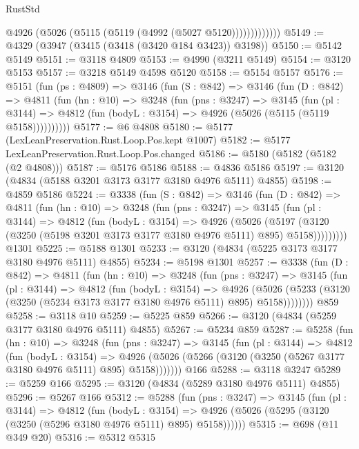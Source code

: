 \begin{lexlean}{RustStd}
\begin{coremodule}
{\begin{coremodule}
{{{{{{{{{{{{{{{{{{{{{{{{{{                  @4926 (@5026 (@5115 (@5119 (@4992 (@5027 @5120)))))))))))))
@5149 := @4329 (@3947 (@3415 (@3418 (@3420 @184 @3423)) @3198))
@5150 := @5142 @5149
@5151 := @3118 @4809
@5153 := @4990 (@3211 @5149)
@5154 := @3120 @5153
@5157 := @3218 @5149 @4598 @5120
@5158 := @5154 @5157
@5176 := @5151
    (fun (ps : @4809) =>
    @3146
      (fun (S : @842) =>
      @3146
        (fun (D : @842) =>
        @4811
          (fun (hn : @10) =>
          @3248
            (fun (pns : @3247) =>
            @3145
              (fun (pl : @3144) =>
              @4812 (fun (bodyL : @3154) => @4926 (@5026 (@5115 (@5119 @5158))))))))))
@5177 := @6 @4808
@5180 := @5177 (LexLeanPreservation.Rust.Loop.Pos.kept @1007)
@5182 := @5177 LexLeanPreservation.Rust.Loop.Pos.changed
@5186 := @5180 (@5182 (@5182 (@2 @4808)))
@5187 := @5176 @5186
@5188 := @4836 @5186
@5197 := @3120 (@4834 (@5188 @3201 @3173 @3177 @3180 @4976 @5111) @4855)
@5198 := @4859 @5186
@5224 := @3338
    (fun (S : @842) =>
    @3146
      (fun (D : @842) =>
      @4811
        (fun (hn : @10) =>
        @3248
          (fun (pns : @3247) =>
          @3145
            (fun (pl : @3144) =>
            @4812
              (fun (bodyL : @3154) =>
              @4926
                (@5026
                  (@5197
                    (@3120 (@3250 (@5198 @3201 @3173 @3177 @3180 @4976 @5111) @895) @5158)))))))))
    @1301
@5225 := @5188 @1301
@5233 := @3120 (@4834 (@5225 @3173 @3177 @3180 @4976 @5111) @4855)
@5234 := @5198 @1301
@5257 := @3338
    (fun (D : @842) =>
    @4811
      (fun (hn : @10) =>
      @3248
        (fun (pns : @3247) =>
        @3145
          (fun (pl : @3144) =>
          @4812
            (fun (bodyL : @3154) =>
            @4926
              (@5026 (@5233 (@3120 (@3250 (@5234 @3173 @3177 @3180 @4976 @5111) @895) @5158))))))))
    @859
@5258 := @3118 @10
@5259 := @5225 @859
@5266 := @3120 (@4834 (@5259 @3177 @3180 @4976 @5111) @4855)
@5267 := @5234 @859
@5287 := @5258
    (fun (hn : @10) =>
    @3248
      (fun (pns : @3247) =>
      @3145
        (fun (pl : @3144) =>
        @4812
          (fun (bodyL : @3154) =>
          @4926 (@5026 (@5266 (@3120 (@3250 (@5267 @3177 @3180 @4976 @5111) @895) @5158)))))))
    @166
@5288 := @3118 @3247
@5289 := @5259 @166
@5295 := @3120 (@4834 (@5289 @3180 @4976 @5111) @4855)
@5296 := @5267 @166
@5312 := @5288
    (fun (pns : @3247) =>
    @3145
      (fun (pl : @3144) =>
      @4812
        (fun (bodyL : @3154) =>
        @4926 (@5026 (@5295 (@3120 (@3250 (@5296 @3180 @4976 @5111) @895) @5158))))))
@5315 := @698 (@11 @349 @20)
@5316 := @5312 @5315
}}}}}}}}}}}}}}}}}}}}}}}}}}
\end{coremodule}}
\end{coremodule}
\end{lexlean}
